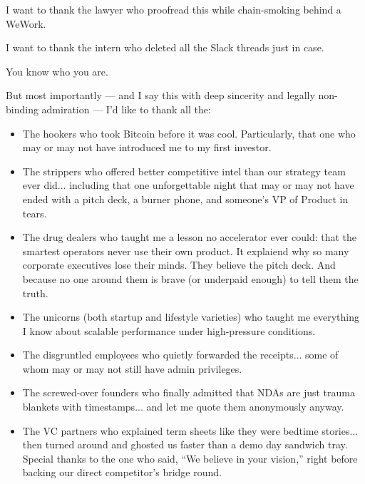 \documentclass{article}
\begin{document}
  I want to thank the lawyer who proofread this while chain-smoking behind a WeWork.  

  I want to thank the intern who deleted all the Slack threads just in case.

  You know who you are.

  But most importantly — and I say this with deep sincerity and legally non-binding admiration —  
  I’d like to thank all the:
  
  \begin{itemize}
    \item The hookers who took Bitcoin before it was cool. Particularly, that one who may or may not 
    have introduced me to my first investor.
    
    \item The strippers who offered better competitive intel than our strategy team ever did... 
    including that one unforgettable night that may or may not have ended with a pitch deck, a burner phone, 
    and someone's VP of Product in tears.
    
    \item The drug dealers who taught me a lesson no accelerator ever could:  
    that the smartest operators never use their own product.  
    It explaiend why so many corporate executives lose their minds.  
    They believe the pitch deck.  
    And because no one around them is brave (or underpaid enough) to tell them the truth.
    
    \item The unicorns (both startup and lifestyle varieties) who taught me everything I know about scalable performance under high-pressure conditions.
    
    \item The disgruntled employees who quietly forwarded the receipts... some of whom may or may not still have admin privileges.
    
    \item The screwed-over founders who finally admitted that NDAs are just trauma blankets with timestamps... and let me quote them anonymously anyway.

    \item The VC partners who explained term sheets like they were bedtime stories...  
    then turned around and ghosted us faster than a demo day sandwich tray.  
    Special thanks to the one who said, ``We believe in your vision,''
    right before backing our direct competitor's bridge round.
  \end{itemize}
  
\end{document}
